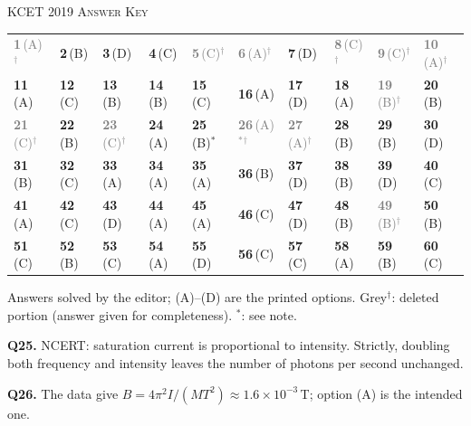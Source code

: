 \par{}\vspace{14pt}
\begin{center}{}\par
{\large\color{navy}\scshape KCET 2019 \textperiodcentered{} Answer Key}\end{center}
{\small\setlength{\tabcolsep}{1pt}\renewcommand{\arraystretch}{1.5}
\begin{tabularx}{\linewidth}{@{}*{10}{>{\centering\arraybackslash}X}@{}}\toprule
\textcolor{gray}{\textbf{1}\,(A)$^{\dagger}$} & \textbf{2}\,(B) & \textbf{3}\,(D) & \textbf{4}\,(C) & \textcolor{gray}{\textbf{5}\,(C)$^{\dagger}$} & \textcolor{gray}{\textbf{6}\,(A)$^{\dagger}$} & \textbf{7}\,(D) & \textcolor{gray}{\textbf{8}\,(C)$^{\dagger}$} & \textcolor{gray}{\textbf{9}\,(C)$^{\dagger}$} & \textcolor{gray}{\textbf{10}\,(A)$^{\dagger}$}\\
\textbf{11}\,(A) & \textbf{12}\,(C) & \textbf{13}\,(B) & \textbf{14}\,(B) & \textbf{15}\,(C) & \textbf{16}\,(A) & \textbf{17}\,(D) & \textbf{18}\,(A) & \textcolor{gray}{\textbf{19}\,(B)$^{\dagger}$} & \textbf{20}\,(B)\\
\textcolor{gray}{\textbf{21}\,(C)$^{\dagger}$} & \textbf{22}\,(B) & \textcolor{gray}{\textbf{23}\,(C)$^{\dagger}$} & \textbf{24}\,(A) & \textbf{25}\,(B)$^{*}$ & \textcolor{gray}{\textbf{26}\,(A)$^{*}$$^{\dagger}$} & \textcolor{gray}{\textbf{27}\,(A)$^{\dagger}$} & \textbf{28}\,(B) & \textbf{29}\,(B) & \textbf{30}\,(D)\\
\textbf{31}\,(B) & \textbf{32}\,(C) & \textbf{33}\,(A) & \textbf{34}\,(A) & \textbf{35}\,(A) & \textbf{36}\,(B) & \textbf{37}\,(D) & \textbf{38}\,(B) & \textbf{39}\,(D) & \textbf{40}\,(C)\\
\textbf{41}\,(A) & \textbf{42}\,(C) & \textbf{43}\,(D) & \textbf{44}\,(A) & \textbf{45}\,(A) & \textbf{46}\,(C) & \textbf{47}\,(D) & \textbf{48}\,(B) & \textcolor{gray}{\textbf{49}\,(B)$^{\dagger}$} & \textbf{50}\,(B)\\
\textbf{51}\,(C) & \textbf{52}\,(B) & \textbf{53}\,(C) & \textbf{54}\,(A) & \textbf{55}\,(D) & \textbf{56}\,(C) & \textbf{57}\,(C) & \textbf{58}\,(A) & \textbf{59}\,(B) & \textbf{60}\,(C)\\\bottomrule\end{tabularx}}\par\smallskip
{\footnotesize Answers solved by the editor; (A)--(D) are the printed options. {\color{gray}Grey$^{\dagger}$}: deleted portion (answer given for completeness). $^{*}$: see note.\par
\par\smallskip\textbf{Q25.} NCERT: saturation current is proportional to intensity. Strictly, doubling both frequency and intensity leaves the number of photons per second unchanged.
\par\smallskip\textbf{Q26.} The data give $B = 4\pi^2 I/(MT^2) \approx 1.6\times10^{-3}$\,T; option (A) is the intended one.
}\par

